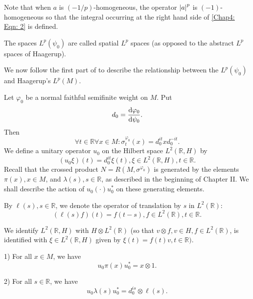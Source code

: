 Note that when $a$ is $(-1/p)$-homogeneous, the operator $\abs{a}^p$ is $(-1)$-homogeneous so that the integral occurring at the right hand side of \eqref{Chap4: Eqn: 2} is defined.\par
The spaces $L^p(\psi_0)$ are called spatial $L^p$ spaces (as opposed to the abstract $L^p$ spaces of Haagerup).\par
We now follow the first part of \cite{10} to describe the relationship between the $L^p(\psi_0)$ and Haagerup's $L^p(M)$.\par
Let $\varphi_0$ be a normal faithful semifinite weight on $M$. Put
\begin{equation}
    d_0=\dv{\varphi_0}{\psi_0}.
\end{equation}
Then
\begin{equation}
    \forall t\in \mathbb{R}\forall x\in M:\sigma_t^{\varphi_0}(x)=d_0^{it}xd_0^{-it}.
\end{equation}
We define a unitary operator $u_0$ on the Hilbert space $L^2(\mathbb{R},H)$ by
\begin{equation}\label{Chap4: Eqn: 7}
    (u_0\xi)(t)=d_0^{it}\xi(t),\xi\in L^2(\mathbb{R},H),t\in \mathbb{R}.
\end{equation}
Recall that the crossed product $N=R(M,\sigma^{\varphi_0})$ is generated by the elements $\pi(x),x\in M$, and $\lambda(s),s\in \mathbb{R}$, as described in the beginning of Chapter II. We shall describe the action of $u_0(\cdot)u_0^*$ on these generating elements.\par
By $\ell(s), s\in \mathbb{R}$, we denote the operator of translation by $s$ in $L^2(\mathbb{R})$:
\[
    (\ell(s)f)(t)=f(t-s),f\in L^2(\mathbb{R}),t\in \mathbb{R}.
\]\par
We identify $L^2(\mathbb{R},H)$ with $H\otimes L^2(\mathbb{R})$ (so that $v\otimes f,v\in H,f\in L^2(\mathbb{R})$, is identified with $\xi\in L^2(\mathbb{R},H)$ given by $\xi(t)=f(t)v,t\in \mathbb{R})$.
\begin{proposition}\label{Chap4: Prop: 3}
    1) For all $x\in M$, we have
    \[
        u_0\pi(x)u_0^*=x\otimes 1.
    \]

    2) For all $s\in \mathbb{R}$, we have
    \[
        u_0\lambda(s)u_0^*=d_0^{is}\otimes \ell(s).
    \]
\end{proposition}
